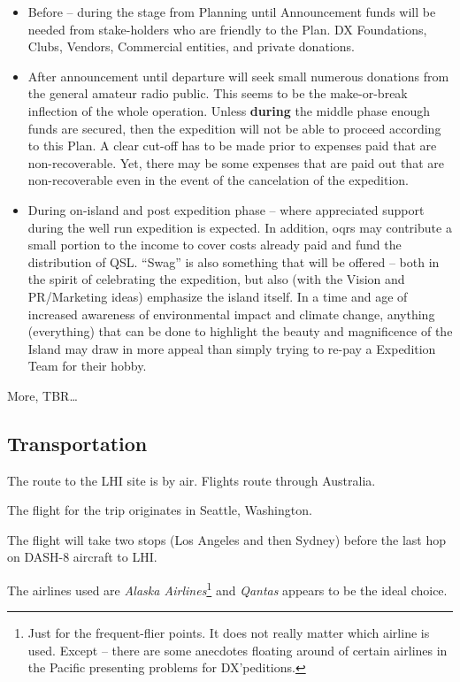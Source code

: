 \documentclass[11pt]{article}
\begin{document}
\begin{itemize}
\item Before -- during the stage from Planning until Announcement
funds will be needed from stake-holders who are friendly to the
Plan.   DX Foundations, Clubs, Vendors, Commercial entities,
and private donations.
\item After announcement until departure will seek small
numerous donations from the general amateur radio public.  This
seems to be the make-or-break inflection of the whole operation.
Unless {\textbf{during}} the middle phase enough funds are secured,
then the expedition will not be able to proceed according to this Plan.
A clear cut-off has to be made prior to expenses paid that are 
non-recoverable.   Yet, there may be some expenses that are paid
out that are non-recoverable even in the event of the cancelation
of the expedition.
\item During on-island and post expedition phase -- where 
appreciated support during the well run expedition is expected.  In
addition, {\gls{oqrs}} may contribute a small portion to the
income to cover costs already paid and fund the distribution of
QSL.   ``Swag'' is also something that will be offered -- both
in the spirit of celebrating the expedition, but also (with the
Vision and PR/Marketing ideas) emphasize the island itself.
In a time and age of increased awareness of environmental
impact and climate change, anything (everything) that can be
done to highlight the beauty and magnificence of the Island
may draw in more appeal than simply trying to re-pay
a Expedition Team for their hobby.
\end{itemize}

More, TBR\ldots

\subsection{Transportation}

The route to the LHI site is by air.  Flights route through
Australia.
\par
The flight for the trip originates in Seattle, Washington.
\par
The flight will take two stops (Los Angeles and then Sydney)
before the last hop on DASH-8 aircraft to LHI.

\par
The airlines used are {\textit{Alaska Airlines}}\footnote{
Just for the frequent-flier points.  It does not really
matter which airline is used.  Except -- there are
some anecdotes floating around of certain airlines
in the Pacific presenting problems for DX'peditions.} 
 and {\textit{Qantas}} appears to be the ideal choice.  
\end{document}
